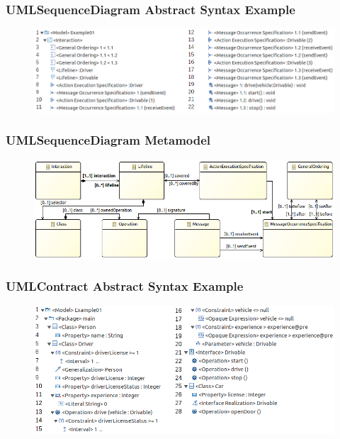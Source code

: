 \documentclass{beamer}
\begin{document}
\begin{frame}[t]
	\frametitle{UMLSequenceDiagram Abstract Syntax Example}
	\begin{figure}[H]
   		\includegraphics[width=\textwidth]{umlSequenceDiagramExample01}
	\end{figure}
\end{frame}

\begin{frame}[t]
	\frametitle{UMLSequenceDiagram Metamodel}
	\begin{figure}[H]
		\includegraphics[width=\textwidth]{umlSequenceDiagramSimple01}
	\end{figure}
\end{frame}

\begin{frame}[t]
	\frametitle{UMLContract Abstract Syntax Example}
	\begin{figure}[H]
		\includegraphics[width=\textwidth]{umlContractDiagramExample01}
	\end{figure}
\end{frame}
\end{document}
